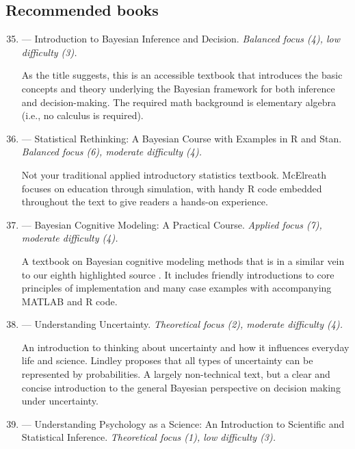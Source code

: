 \subsection*{Recommended books}

\begin{enumerate}
  \setcounter{enumi}{34}

\item 
\textbf{} --- Introduction to Bayesian Inference and Decision. \textit{Balanced focus (4), low difficulty (3).}

As the title suggests, this is an accessible textbook that introduces the basic concepts and theory underlying the Bayesian framework for both inference and decision-making. The required math background is elementary algebra (i.e., no calculus is required).

\item
\textbf{} --- Statistical Rethinking: A Bayesian Course with Examples in R and Stan. \textit{Balanced focus (6), moderate difficulty (4).}

Not your traditional applied introductory statistics textbook. McElreath focuses on education through simulation, with handy R code embedded throughout the text to give readers a hands-on experience. 

\item
\textbf{} --- Bayesian Cognitive Modeling: A Practical Course. \emph{Applied focus (7), moderate difficulty (4).}

A textbook on Bayesian cognitive modeling methods that is in a similar vein to our eighth highlighted source \cite{lee2008}. It includes friendly introductions to core principles of implementation and many case examples with accompanying MATLAB and R code. 

\item
\textbf{} --- Understanding Uncertainty. \emph{Theoretical focus (2), moderate difficulty (4).}

An introduction to thinking about uncertainty and how it influences everyday life and science. Lindley proposes that all types of uncertainty can be represented by probabilities. A largely non-technical text, but a clear and concise introduction to the general Bayesian perspective on decision making under uncertainty. 

\item
\textbf{} --- Understanding Psychology as a Science: An Introduction to Scientific and Statistical Inference. \emph{Theoretical focus (1), low difficulty (3).}


\end{enumerate}
